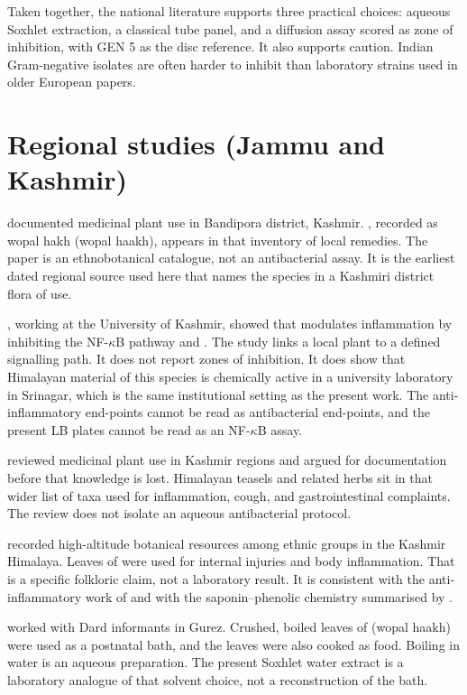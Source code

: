 Taken together, the national literature supports three practical choices: aqueous Soxhlet extraction, a classical tube panel, and a diffusion assay scored as zone of inhibition, with GEN 5 as the disc reference. It also supports caution. Indian Gram-negative isolates are often harder to inhibit than laboratory strains used in older European papers.

\section{Regional studies (Jammu and Kashmir)}

\citet{lone2015study} documented medicinal plant use in Bandipora district, Kashmir. , recorded as wopal hakh (wopal haakh), appears in that inventory of local remedies. The paper is an ethnobotanical catalogue, not an antibacterial assay. It is the earliest dated regional source used here that names the species in a Kashmiri district flora of use.

\citet{hassan2020dipsacus}, working at the University of Kashmir, showed that  modulates inflammation by inhibiting the NF-$\kappa$B pathway \invitro{} and \invivo{}. The study links a local plant to a defined signalling path. It does not report zones of inhibition. It does show that Himalayan material of this species is chemically active in a university laboratory in Srinagar, which is the same institutional setting as the present work. The anti-inflammatory end-points cannot be read as antibacterial end-points, and the present LB plates cannot be read as an NF-$\kappa$B assay.

\citet{bhat2021ethnobotany} reviewed medicinal plant use in Kashmir regions and argued for documentation before that knowledge is lost. Himalayan teasels and related herbs sit in that wider list of taxa used for inflammation, cough, and gastrointestinal complaints. The review does not isolate an aqueous antibacterial protocol.

\citet{haq2023cross} recorded high-altitude botanical resources among ethnic groups in the Kashmir Himalaya. Leaves of  were used for internal injuries and body inflammation. That is a specific folkloric claim, not a laboratory result. It is consistent with the anti-inflammatory work of \citet{hassan2020dipsacus} and with the saponin--phenolic chemistry summarised by \citet{skala2023dipsacus}.

\citet{ahad2023ethnobotanical} worked with Dard informants in Gurez. Crushed, boiled leaves of  (wopal haakh) were used as a postnatal bath, and the leaves were also cooked as food. Boiling in water is an aqueous preparation. The present Soxhlet water extract is a laboratory analogue of that solvent choice, not a reconstruction of the bath.

